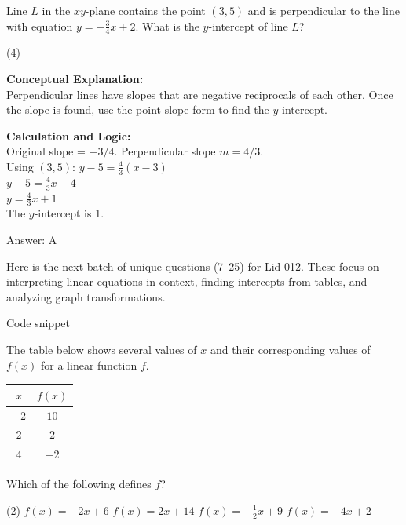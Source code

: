 \documentclass[11pt,paper=a4,answers]{exam}
\begin{document}
\begin{questions}
\question
Line $L$ in the $xy$-plane contains the point $(3, 5)$ and is perpendicular to the line with equation $y = -\frac{3}{4}x + 2$. What is the $y$-intercept of line $L$?
\begin{tasks}(4)
\end{tasks}

\begin{solution}
\textbf{Conceptual Explanation:} \\
Perpendicular lines have slopes that are negative reciprocals of each other. Once the slope is found, use the point-slope form to find the $y$-intercept.

\vspace{10pt}
\textbf{Calculation and Logic:} \\
Original slope = $-3/4$. Perpendicular slope $m = 4/3$. \\
Using $(3, 5)$: $y - 5 = \frac{4}{3}(x - 3)$ \\
$y - 5 = \frac{4}{3}x - 4$ \\
$y = \frac{4}{3}x + 1$ \\
The $y$-intercept is 1.

\vspace{15pt}
Answer: \colorbox{yellow!100}{A}
\end{solution}

\vspace{20pt}

Here is the next batch of unique questions (7–25) for Lid 012. These focus on interpreting linear equations in context, finding intercepts from tables, and analyzing graph transformations.

Code snippet


\question
The table below shows several values of $x$ and their corresponding values of $f(x)$ for a linear function $f$.
\begin{center}
\begin{tabular}{|c|c|}
\hline
$x$ & $f(x)$ \\ \hline
$-2$ & $10$ \\ \hline
$2$ & $2$ \\ \hline
$4$ & $-2$ \\ \hline
\end{tabular}
\end{center}
Which of the following defines $f$?
\begin{tasks}(2)
    \task $f(x) = -2x + 6$
    \task $f(x) = 2x + 14$
    \task $f(x) = -\frac{1}{2}x + 9$
    \task $f(x) = -4x + 2$
\end{tasks}


\end{questions}
\end{document}

